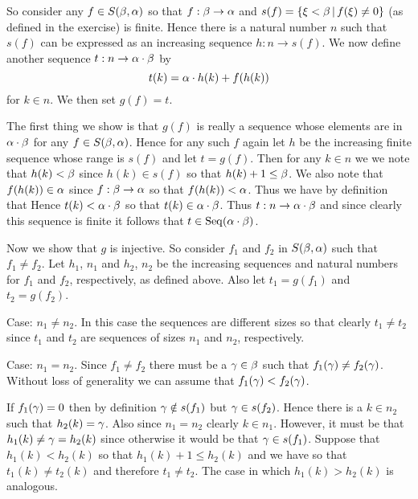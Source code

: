 {{    So consider any $f \in S(\beta, \alpha)$ so that $f:\beta \to \alpha$ and $s(f) = \left\{ \xi < \beta \,|\, f(\xi) \neq 0 \right\}$ (as defined in the exercise) is finite.
    Hence there is a natural number $n$ such that $s(f)$ can be expressed as an increasing sequence $h: n \to s(f)$.
    We now define another sequence $t: n \to \alpha \cdot \beta$ by
    $$
    t(k) = \alpha \cdot h(k) + f(h(k))
    $$
    for $k \in n$.
    We then set $g(f) = t$.

    The first thing we show is that $g(f)$ is really a sequence whose elements are in $\alpha \cdot \beta$ for any $f \in S(\beta, \alpha)$.
    Hence for any such $f$ again let $h$ be the increasing finite sequence whose range is $s(f)$ and let $t = g(f)$.
    Then for any $k \in n$ we we note that $h(k) < \beta$ since $h(k) \in s(f)$ so that $h(k) + 1 \leq \beta$.
    We also note that $f(h(k)) \in \alpha$ since $f: \beta \to \alpha$ so that $f(h(k)) < \alpha$.
    Thus we have by definition that
    Hence $t(k) < \alpha \cdot \beta$ so that $t(k) \in \alpha \cdot \beta$.
    Thus $t: n \to \alpha \cdot \beta$ and since clearly this sequence is finite it follows that $t \in \mathrm{Seq}(\alpha \cdot \beta)$.

    Now we show that $g$ is injective.
    So consider $f_1$ and $f_2$ in $S(\beta, \alpha)$ such that $f_1 \neq f_2$.
    Let $h_1$, $n_1$ and $h_2$, $n_2$ be the increasing sequences and natural numbers for $f_1$ and $f_2$, respectively, as defined above.
    Also let $t_1 = g(f_1)$ and $t_2 = g(f_2)$.

    Case: $n_1 \neq n_2$.
    In this case the sequences are different sizes so that clearly $t_1 \neq t_2$ since $t_1$ and $t_2$ are sequences of sizes $n_1$ and $n_2$, respectively.

    Case: $n_1 = n_2$.
    Since $f_1 \neq f_2$ there must be a $\gamma \in \beta$ such that $f_1(\gamma) \neq f_2(\gamma)$.
    Without loss of generality we can assume that $f_1(\gamma) < f_2(\gamma)$.

    If $f_1(\gamma) = 0$ then by definition $\gamma \notin s(f_1)$ but $\gamma \in s(f_2)$.
    Hence there is a $k \in n_2$ such that $h_2(k) = \gamma$.
    Also since $n_1 = n_2$ clearly $k \in n_1$.
    However, it must be that $h_1(k) \neq \gamma = h_2(k)$ since otherwise it would be that $\gamma \in s(f_1)$.
    Suppose that $h_1(k) < h_2(k)$ so that $h_1(k) + 1 \leq h_2(k)$ and we have
    so that $t_1(k) \neq t_2(k)$ and therefore $t_1 \neq t_2$.
    The case in which $h_1(k) > h_2(k)$ is analogous.

}}
